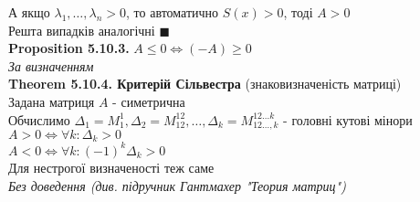 \documentclass[a4paper, 14pt]{extarticle}
\def\prp#1{\textbf{Proposition {#1}}}
\def\th#1{\textbf{Theorem {#1}}}
\def\bigline{\vspace{5mm}\\}
\def\qed{$\blacksquare$}
\begin{document}
А якщо $\lambda_1,\dots,\lambda_n > 0$, то автоматично $S(x) > 0$, тоді $A>0$\\
Решта випадків аналогічні \qed
\bigline
\prp{5.10.3.} $A \leq 0 \iff (-A) \geq 0$\\
\textit{За визначенням}
\bigline
\th{5.10.4. Критерій Сільвестра} (знаковизначеність матриці)\\
Задана матриця $A$ - симетрична\\
Обчислимо $\Delta_1 = M_1^1, \Delta_2 = M_{12}^{12}, \dots, \Delta_k = M^{12\dots k}_{12 \dots, k}$ - головні кутові мінори\\
$A>0 \iff \forall k: \Delta_k > 0$\\
$A < 0 \iff \forall k: (-1)^k \Delta_k > 0$\\
Для нестрогої визначеності теж саме\\
\textit{Без доведення (див. підручник Гантмахер "Теория матриц")}
\bigline
\end{document}
